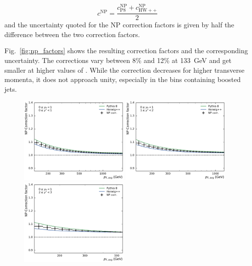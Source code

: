 \begin{equation*}
    c^\mathrm{NP} = \frac{c_{\mathrm{P8}}^{\mathrm{NP}} + c_{\mathrm{HW++}}^{\mathrm{NP}}}{2}
\end{equation*}
%
and the uncertainty quoted for the NP correction factors is given by half the difference
between the two correction factors.

Fig.~\ref{fig:np_factors} shows the resulting correction factors and the
corresponding uncertainty. The corrections vary between 8\% and 12\% at
\SI{133}{\GeV} and get smaller at higher values of \ptavg. While the correction
decreases for higher transverse momenta, it does not approach unity, especially
in the bins containing boosted jets. 

\begin{figure}[htp]
    \centering
    \includegraphics[width=0.48\textwidth]{figures/theory/np_factors_calc_yb0ys0.pdf}\hfill
    \includegraphics[width=0.48\textwidth]{figures/theory/np_factors_calc_yb0ys1.pdf}
    \includegraphics[width=0.48\textwidth]{figures/theory/np_factors_calc_yb0ys2.pdf}\hfill

\end{figure}
